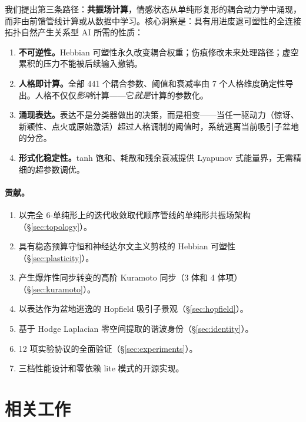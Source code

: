 \documentclass[UTF8,11pt]{ctexart}
\begin{document}
我们提出第三条路径：\textbf{共振场计算}，情感状态从单纯形复形的耦合动力学中涌现，而非由前馈管线计算或从数据中学习。核心洞察是：具有用进废退可塑性的全连接拓扑自然产生关系型 AI 所需的性质：

\begin{enumerate}[leftmargin=*]
\item \textbf{不可逆性。}Hebbian 可塑性永久改变耦合权重；伤痕修改未来处理路径；虚空累积的压力不能被后续输入撤销。
\item \textbf{人格即计算。}全部 441 个耦合参数、阈值和衰减率由 7 个人格维度确定性导出。人格不仅仅\emph{影响}计算——它\emph{就是}计算的参数化。
\item \textbf{涌现表达。}表达不是分类器做出的决策，而是相变——当任一驱动力（惊讶、新颖性、点火或原始激活）超过人格调制的阈值时，系统逃离当前吸引子盆地的分岔。
\item \textbf{形式化稳定性。}tanh 饱和、耗散和残余衰减提供 Lyapunov 式能量界，无需精细的超参数调优。
\end{enumerate}

\paragraph{贡献。}
\begin{enumerate}[leftmargin=*]
\item 以完全 6-单纯形上的迭代收敛取代顺序管线的单纯形共振场架构（\S\ref{sec:topology}）。
\item 具有稳态预算守恒和神经达尔文主义剪枝的 Hebbian 可塑性（\S\ref{sec:plasticity}）。
\item 产生爆炸性同步转变的高阶 Kuramoto 同步（3 体和 4 体项）（\S\ref{sec:kuramoto}）。
\item 以表达作为盆地逃逸的 Hopfield 吸引子景观（\S\ref{sec:hopfield}）。
\item 基于 Hodge Laplacian 零空间提取的谐波身份（\S\ref{sec:identity}）。
\item 12 项实验协议的全面验证（\S\ref{sec:experiments}）。
\item 三档性能设计和零依赖 lite 模式的开源实现。
\end{enumerate}

\section{相关工作}
\label{sec:related}
\end{document}

